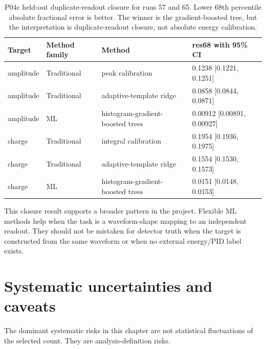 \begin{table}[H]
  \centering
  \small
  \caption{P04c held-out duplicate-readout closure for runs 57 and 65.  Lower
  68th percentile absolute fractional error is better.  The winner is the
  gradient-boosted tree, but the interpretation is duplicate-readout closure,
  not absolute energy calibration.}
  \label{tab:p04c-closure}
  \begin{tabular}{p{}p{}p{}p{}}
    \toprule
    Target & Method family & Method & res68 with 95\% CI \\
    \midrule
    amplitude & Traditional & peak calibration & 0.1238 [0.1221, 0.1251] \\
    amplitude & Traditional & adaptive-template ridge & 0.0858 [0.0844, 0.0871] \\
    amplitude & ML & histogram-gradient-boosted trees & 0.00912 [0.00891, 0.00927] \\
    charge & Traditional & integral calibration & 0.1954 [0.1936, 0.1975] \\
    charge & Traditional & adaptive-template ridge & 0.1554 [0.1530, 0.1573] \\
    charge & ML & histogram-gradient-boosted trees & 0.0151 [0.0148, 0.0153] \\
    \bottomrule
  \end{tabular}
\end{table}

This closure result supports a broader pattern in the project.  Flexible ML
methods help when the task is a waveform-shape mapping to an independent
readout.  They should not be mistaken for detector truth when the target is
constructed from the same waveform or when no external energy/PID label exists.

\section{Systematic uncertainties and caveats}
\label{sec:data-systematics}

The dominant systematic risks in this chapter are not statistical fluctuations
of the selected count.  They are analysis-definition risks.

